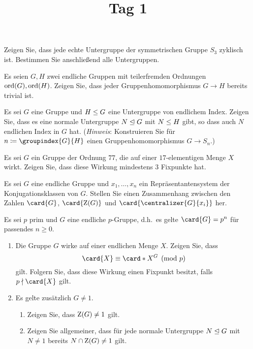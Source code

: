 \documentclass[a4paper, 10pt]{scrartcl}
\title{Tag 1}
\author{}
\date{}
\begin{document}
\begin{question}
  Zeigen Sie, dass jede echte Untergruppe der symmetrischen Gruppe $S_3$ zyklisch ist.
  Bestimmen Sie anschließend alle Untergruppen.
\end{question}

\begin{question}
  Es seien $G, H$ zwei endliche Gruppen mit teilerfremden Ordnungen $\operatorname{ord}(G), \operatorname{ord}(H)$.
  Zeigen Sie, dass jeder Gruppenhomomorphismus $G \to H$ bereits trivial ist.
\end{question}

\begin{question}
  Es sei $G$ eine Gruppe und $H \mathrel{\leq} G$ eine Untergruppe von endlichem Index.
  Zeigen Sie, dass es eine normale Untergruppe $N \mathrel{\trianglelefteq} G$ mit $N \mathrel{\leq} H$ gibt, so dass auch $N$ endlichen Index in $G$ hat.
  \newline
  (\emph{Hinweis}:
  Konstruieren Sie für $n \defined \groupindex{G}{H}$ einen Gruppenhomomorphismus $G \to S_n$.)
\end{question}

\begin{question}
  Es sei $G$ ein Gruppe der Ordnung $77$, die auf einer $17$-elementigen Menge $X$ wirkt.
  Zeigen Sie, dass diese Wirkung mindestens $3$ Fixpunkte hat.
\end{question}

\begin{question}
  Es sei $G$ eine endliche Gruppe und $x_1, \dotsc, x_n$ ein Repräsentantensystem der Konjugationsklassen von $G$.
  Stellen Sie einen Zusammenhang zwischen den Zahlen $\card{G}$, $\card{\groupcenter{G}}$ und $\card{\centralizer{G}{x_i}}$ her.
\end{question}

\begin{question}
  Es sei $p$ prim und $G$ eine endliche $p$-Gruppe, d.h.\ es gelte $\card{G} = p^n$ für passendes $n \geq 0$.
  \begin{enumerate}
    \item
      Die Gruppe $G$ wirke auf einer endlichen Menge $X$.
      Zeigen Sie, dass
      \[
                \card{X}
        \equiv  \card*{X^G}
        \pmod{p}
      \]
      gilt.
      Folgern Sie, dass diese Wirkung einen Fixpunkt besitzt, falls $p \notdivides \card{X}$ gilt.
    \item
      Es gelte zusätzlich $G \neq 1$.
      \begin{enumerate}
        \item
          Zeigen Sie, dass $\operatorname{Z}(G) \neq 1$ gilt.
        \item
          Zeigen Sie allgemeiner, dass für jede normale Untergruppe $N \mathrel{\trianglelefteq} G$ mit $N \neq 1$ bereits $N \cap \operatorname{Z}(G) \neq 1$ gilt.
      \end{enumerate}
  \end{enumerate}
\end{question}
\end{document}

